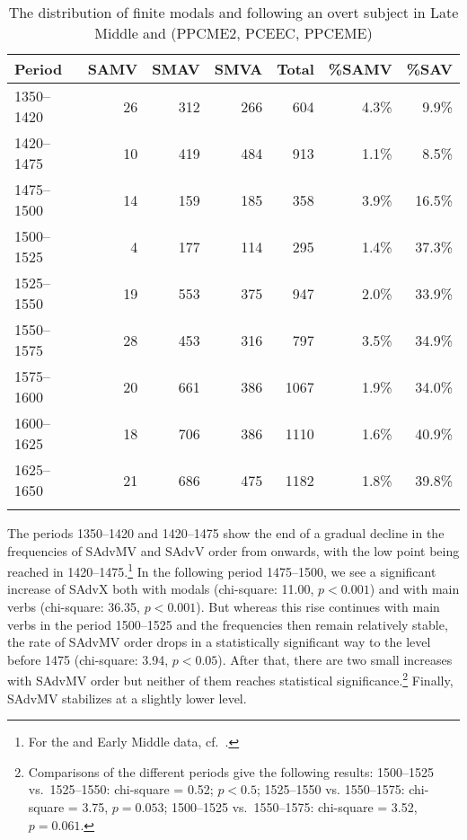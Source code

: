 \documentclass[output=paper]{langsci/langscibook}
\begin{document}
\begin{table}
\caption{The distribution of finite modals and  following an overt
    subject in Late Middle and  (PPCME2, PCEEC,
PPCEME)\label{tab:key:09.1}}
\begin{tabular}{lrrrrrr}
\lsptoprule
{Period} & {SAMV} & {SMAV} & {SMVA} & {Total} & {\%SAMV} & {\%SAV}\\
\midrule
1350--1420 & 26 & 312 & 266 & 604 & 4.3\% & 9.9\%\\
1420--1475 & 10 & 419 & 484 & 913 & 1.1\% & 8.5\%\\
1475--1500 & 14 & 159 & 185 & 358 & 3.9\% & 16.5\%\\
1500--1525 & 4 & 177 & 114 & 295 & 1.4\% & 37.3\%\\
1525--1550 & 19 & 553 & 375 & 947 & 2.0\% & 33.9\%\\
1550--1575 & 28 & 453 & 316 & 797 & 3.5\% & 34.9\%\\
1575--1600 & 20 & 661 & 386 & 1067 & 1.9\% & 34.0\%\\
1600--1625 & 18 & 706 & 386 & 1110 & 1.6\% & 40.9\%\\
1625--1650 & 21 & 686 & 475 & 1182 & 1.8\% & 39.8\%\\
\lspbottomrule
\end{tabular}
\end{table}

The periods 1350--1420 and 1420--1475 show the end of a gradual decline in the
frequencies of SAdvMV and SAdvV order from  onwards, with the low
point being reached in 1420--1475.\footnote{For the  and Early
Middle  data, cf.\ \textcites[512]{HaeIhs2016}{HaeIhsta}.}  In the
following period 1475--1500, we see a significant increase of SAdvX both with
modals (chi-square: 11.00, $p < 0.001$) and with main verbs (chi-square: 36.35, $p
< 0.001$). But whereas this rise continues with main verbs in the period
1500--1525 and the frequencies then remain relatively stable, the rate of SAdvMV
order drops in a statistically significant way to the level before 1475
(chi-square: 3.94, $p < 0.05$). After that, there are two small increases with
SAdvMV order but neither of them reaches statistical
significance.\footnote{Comparisons of the different periods give the following
    results: 1500--1525 vs.\ 1525--1550: chi-square = 0.52; $p < 0.5$; 1525--1550 vs.
    1550--1575: chi-square = 3.75, $p = 0.053$; 1500--1525 vs.\  1550--1575:
chi-square = 3.52, $p = 0.061$.} Finally, SAdvMV stabilizes at a slightly lower
level.
\end{document}
